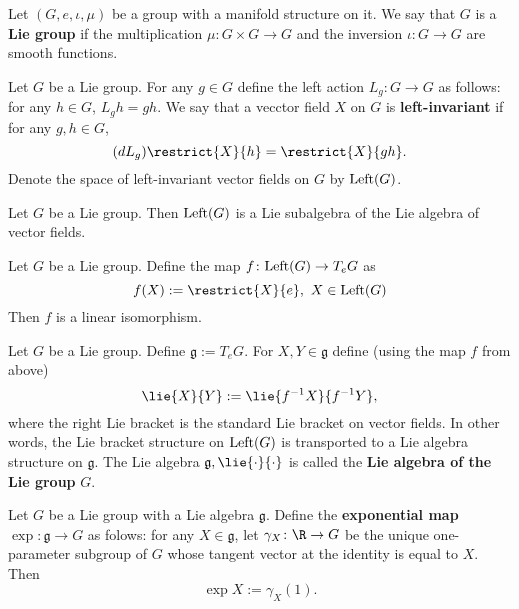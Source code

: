 \begin{definition}
  Let $(G, e, \iota, \mu)$ be a group with a manifold structure on it.
  We say that $G$ is a \textbf{Lie group} if
  the multiplication $\mu \colon G \times G \to G$ and
  the inversion $\iota \colon G \to G$
  are smooth functions.
\end{definition}
\begin{definition}
  Let $G$ be a Lie group.
  For any $g \in G$ define the left action $L_g \colon G \to G$ as follows:
  for any $h \in G$, $L_g h = g h$.
  We say that a vecctor field $X$ on $G$ is \textbf{left-invariant} if for any
  $g, h \in G$,
  \begin{equation}
    (d L_g) \restrict{X}{h} = \restrict{X}{g h}.
  \end{equation}
  Denote the space of left-invariant vector fields on $G$ by ${\rm Left}(G)$.
\end{definition}
\begin{proposition}
  Let $G$ be a Lie group.
  Then ${\rm Left}(G)$ is a Lie subalgebra of the Lie algebra of vector fields.
\end{proposition}
\begin{proposition}
  Let $G$ be a Lie group.
  Define the map $f \colon {\rm Left}(G) \to T_e G$ as
  \begin{equation}
    f(X) := \restrict{X}{e},\ X \in {\rm Left}(G)
  \end{equation}
  Then $f$ is a linear isomorphism.
\end{proposition}
\begin{definition}
   Let $G$ be a Lie group.
   Define $\mathfrak{g} := T_e G$.
   For $X, Y \in \mathfrak{g}$ define (using the map $f$ from above)
   \begin{equation}
     \lie{X}{Y} := \lie{f^{-1} X}{f^{-1} Y},
   \end{equation}
   where the right Lie bracket is the standard Lie bracket on vector fields.
   In other words, the Lie bracket structure on ${\rm Left}(G)$ is transported
   to a Lie algebra structure on $\mathfrak{g}$.
   The Lie algebra $\mathfrak{g}, \lie{\cdot}{\cdot}$ is called the
   \textbf{Lie algebra of the Lie group} $G$.
\end{definition}
\begin{definition}
  Let $G$ be a Lie group with a Lie algebra $\mathfrak{g}$.
  Define the \textbf{exponential map} $\exp \colon \mathfrak{g} \to G$
  as folows: for any $X \in \mathfrak{g}$, let $\gamma_X \colon \R \to G$ be the
  unique one-parameter subgroup of $G$ whose tangent vector at the identity is
  equal to $X$.
  Then
  \begin{equation}
    \exp X := \gamma_X(1).
  \end{equation}
\end{definition}
